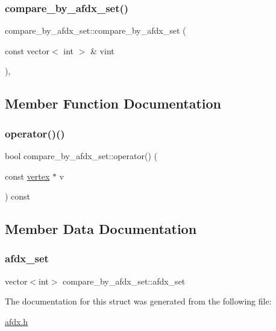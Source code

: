 \subsubsection{\texorpdfstring{compare\+\_\+by\+\_\+afdx\+\_\+set()}{compare\_by\_afdx\_set()}}
{\footnotesize\ttfamily compare\+\_\+by\+\_\+afdx\+\_\+set\+::compare\+\_\+by\+\_\+afdx\+\_\+set (\begin{DoxyParamCaption}\item[{const vector$<$ int $>$ \&}]{vint }\end{DoxyParamCaption})\hspace{0.3cm}{\ttfamily [inline]}, {\ttfamily [explicit]}}



\subsection{Member Function Documentation}
\hypertarget{structcompare__by__afdx__set_a18fa08904cc5f451f09d177d1dae9cdb}{}\label{structcompare__by__afdx__set_a18fa08904cc5f451f09d177d1dae9cdb} 
\subsubsection{\texorpdfstring{operator()()}{operator()()}}
{\footnotesize\ttfamily bool compare\+\_\+by\+\_\+afdx\+\_\+set\+::operator() (\begin{DoxyParamCaption}\item[{const \hyperlink{structvertex}{vertex} $\ast$}]{v }\end{DoxyParamCaption}) const\hspace{0.3cm}{\ttfamily [inline]}}



\subsection{Member Data Documentation}
\hypertarget{structcompare__by__afdx__set_a1e8f179c48ce4510d346cbde1f7c2a6f}{}\label{structcompare__by__afdx__set_a1e8f179c48ce4510d346cbde1f7c2a6f} 
\subsubsection{\texorpdfstring{afdx\+\_\+set}{afdx\_set}}
{\footnotesize\ttfamily vector$<$int$>$ compare\+\_\+by\+\_\+afdx\+\_\+set\+::afdx\+\_\+set}



The documentation for this struct was generated from the following file\+:\begin{DoxyCompactItemize}
\item 
\hyperlink{afdx_8h}{afdx.\+h}\end{DoxyCompactItemize}
